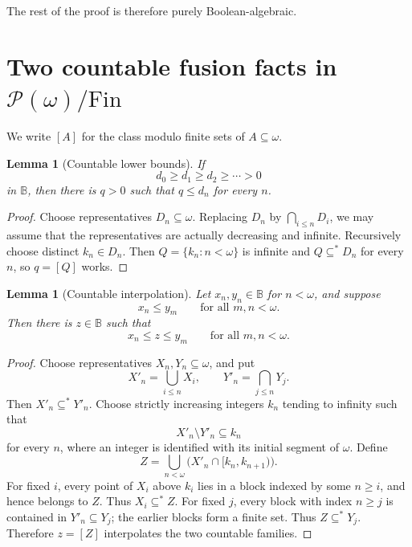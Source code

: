 \documentclass[11pt]{article}
\newtheorem{lemma}[theorem]{Lemma}
\theoremstyle{definition}
\theoremstyle{remark}
\newcommand{\B}{\mathbb B}
\begin{document}
The rest of the proof is therefore purely Boolean-algebraic.

\section{Two countable fusion facts in \(\mathcal P(\omega)/\mathrm{Fin}\)}

We write \([A]\) for the class modulo finite sets of \(A\subseteq\omega\).

\begin{lemma}[Countable lower bounds]\label{lem:sigmaclosed}
If
\[
  d_0\geq d_1\geq d_2\geq\cdots>0
\]
in \(\B\), then there is \(q>0\) such that \(q\leq d_n\) for every \(n\).
\end{lemma}

\begin{proof}
Choose representatives \(D_n\subseteq\omega\).  Replacing \(D_n\) by
\(\bigcap_{i\leq n}D_i\), we may assume that the representatives are actually
decreasing and infinite.  Recursively choose distinct
\(k_n\in D_n\).  Then \(Q=\{k_n:n<\omega\}\) is infinite and
\(Q\subseteq^*D_n\) for every \(n\), so \(q=[Q]\) works.
\end{proof}

\begin{lemma}[Countable interpolation]\label{lem:interpolation}
Let \(x_n,y_n\in\B\) for \(n<\omega\), and suppose
\[
  x_n\leq y_m\qquad\text{for all }m,n<\omega.
\]
Then there is \(z\in\B\) such that
\[
  x_n\leq z\leq y_m\qquad\text{for all }m,n<\omega.
\]
\end{lemma}

\begin{proof}
Choose representatives \(X_n,Y_n\subseteq\omega\), and put
\[
  X'_n=\bigcup_{i\leq n}X_i,
  \qquad
  Y'_n=\bigcap_{j\leq n}Y_j.
\]
Then \(X'_n\subseteq^*Y'_n\).  Choose strictly increasing integers
\(k_n\) tending to infinity such that
\[
  X'_n\setminus Y'_n\subseteq k_n
\]
for every \(n\), where an integer is identified with its initial segment of
\(\omega\).  Define
\[
  Z=\bigcup_{n<\omega}
       \bigl(X'_n\cap[k_n,k_{n+1})\bigr).
\]
For fixed \(i\), every point of \(X_i\) above \(k_i\) lies in a block indexed
by some \(n\geq i\), and hence belongs to \(Z\).  Thus
\(X_i\subseteq^*Z\).  For fixed \(j\), every block with index \(n\geq j\) is
contained in \(Y'_n\subseteq Y_j\); the earlier blocks form a finite set.
Thus \(Z\subseteq^*Y_j\).  Therefore \(z=[Z]\) interpolates the two
countable families.
\end{proof}
\end{document}
